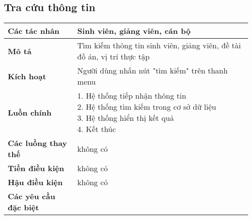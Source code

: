 \subsection{Tra cứu thông tin}
\begin{tabular}{|l|p{}|}
	\hline
	\textbf{Các tác nhân}         & Sinh viên, giảng viên, cán bộ                     \\
	\hline
	\textbf{Mô tả}                & Tìm kiếm thông tin sinh viên, giảng viên, đề tài đồ án, vị trí thực tập \\
	\hline
	\textbf{Kích hoạt}            & Người dùng nhấn nút "tìm kiếm" trên thanh menu                          \\
	\hline
	\textbf{Luồn chính}           & \makecell[l]{1. Hệ thống tiếp nhận thông tin                            \\ 2. Hệ thống tìm kiếm trong cơ sở dữ liệu \\ 3. Hệ thống hiển thị kết quả \\ 4. Kết thúc} \\
	\hline
	\textbf{Các luồng thay thế}   & không có                                                                \\
	\hline
	\textbf{Tiền điều kiện}       & không có                                                                \\
	\hline
	\textbf{Hậu điều kiện}        & không có                                                                \\
	\hline
	\textbf{Các yêu cầu đặc biệt} &                                                                         \\
	\hline
\end{tabular}
